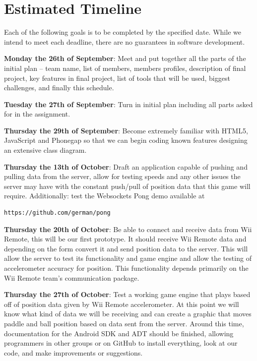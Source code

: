\documentclass[12pt]{article}
\begin{document}
\section{Estimated Timeline}
Each of the following goals is to be completed by the specified date.  While we intend to meet each deadline, there are no guarantees in software development.
\begin{description}
\item \textbf{Monday the 26th of September}: Meet and put together all the parts of the initial plan – team name, list of members, members profiles, description of final project, key features in final project, list of tools that will be used, biggest challenges, and finally this schedule.

\item \textbf{Tuesday the 27th of September}: Turn in initial plan including all parts asked for in the assignment.

\item \textbf{Thursday the 29th of September}: Become extremely familiar with HTML5, JavaScript and Phonegap so
that we can begin coding known features designing an extensive class diagram.

\item \textbf{Thursday the 13th of October}: Draft an application capable of pushing and pulling data from the server, allow for testing speeds and any other issues the server may have with the constant push/pull of position data that this game will require.  Additionally: test the Websockets Pong demo available at \begin{verbatim}
https://github.com/german/pong
\end{verbatim}

\item \textbf{Thursday the 20th of October}: Be able to connect and receive data from Wii Remote, this will be our first prototype.  It should receive Wii Remote data and depending on the form convert it and send position data to the server. This will allow the server to test its functionality and game engine and allow the testing of
accelerometer accuracy for position.  This functionality depends primarily on the Wii Remote team's communication package.

\item \textbf{Thursday the 27th of October}: Test a working game engine that plays based off of position data given by Wii Remote accelerometer. At this point we will know what kind of data we will be receiving and can create a graphic that moves paddle and ball position based on data sent from the server. Around this time,
documentation for the Android SDK and ADT should be finished, allowing programmers in other groups
or on GitHub to install everything, look at our code, and make improvements or suggestions.


\end{description}
\end{document}
